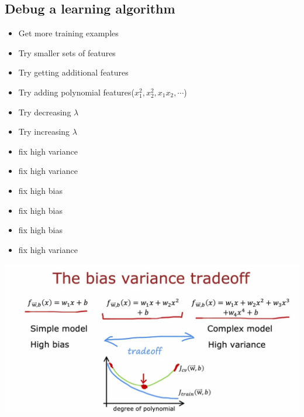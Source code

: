 \subsection*{Debug a learning algorithm}
\begin{minipage}{0.6\textwidth}
    \begin{itemize}
        \item Get more training examples
        \item Try smaller sets of features
        \item Try getting additional features
        \item Try adding polynomial features($x_1^2, x_2^2, x_1x_2, \cdots$)
        \item Try decreasing $\lambda$
        \item Try increasing $\lambda$
    \end{itemize}
\end{minipage}
\begin{minipage}{0.4\textwidth}
    \begin{itemize}
        \item[] fix high variance
        \item[] fix high variance
        \item[] fix high bias
        \item[] fix high bias
        \item[] fix high bias
        \item[] fix high variance
    \end{itemize}
\end{minipage}
\includegraphics*[width=\textwidth]{images/10.16}
